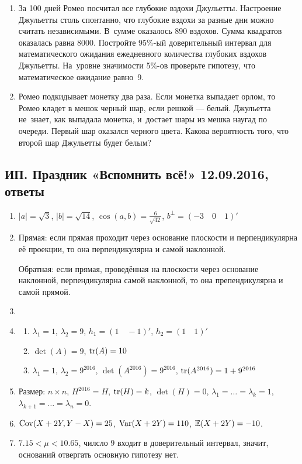 \documentclass[12pt, a4paper]{article}
\begin{document}
\begin{enumerate}
\item За 100 дней Ромео посчитал все глубокие вздохи Джульетты. Настроение Джульетты столь спонтанно, что глубокие вздохи за разные дни можно считать независимыми. В~сумме оказалось 890 вздохов. Сумма квадратов оказалась равна 8000. Постройте 95\%-ый доверительный интервал для математического ожидания ежедневного количества глубоких вздохов Джульетты. На~уровне значимости 5\%-ов проверьте гипотезу, что математическое ожидание равно~9.

\item Ромео подкидывает монетку два раза. Если монетка выпадает орлом, то Ромео кладет в мешок черный шар, если решкой — белый. Джульетта не~знает, как выпадала монетка, и~достает шары из мешка наугад по очереди. Первый шар оказался черного цвета. Какова вероятность того, что второй шар Джульетты будет белым?

\end{enumerate}




\subsection{ИП. Праздник «Вспомнить всё!» 12.09.2016, ответы}

\begin{enumerate}
\item $\lvert a \rvert = \sqrt{3}$, $\lvert b \rvert = \sqrt{14}$, $\cos(a,b) = \frac{6}{\sqrt{42}}$, $b^{\perp} = (-3 \quad 0 \quad 1)'$
\item Прямая: если прямая проходит через основание плоскости и перпендикулярна её проекции, то она перпендикулярна и самой наклонной.

Обратная: если прямая, проведённая на плоскости через основание наклонной, перпендикулярна самой наклонной, то она препендикулярна и самой прямой.
\item
\item
\begin{enumerate}
\item $\lambda_1 = 1$, $\lambda_2 = 9$, $h_1 = (1 \quad -1)'$, $h_2 = (1 \quad 1)'$
\item $\det(A) = 9$, $\operatorname{tr}(A) = 10$
\item $\lambda_1 = 1$, $\lambda_2 = 9^{2016}$, $\det(A^{2016}) = 9^{2016}$, $\operatorname{tr}(A^{2016}) = 1 + 9^{2016}$
\end{enumerate}
\item Размер: $n \times n$, $H^{2016} = H$, $\operatorname{tr}(H) = k$, $\det(H) = 0$, $\lambda_1 = \ldots = \lambda_k = 1$, $\lambda_{k+1} = \ldots = \lambda_{n} = 0$.
\item  $\operatorname{Cov}(X+2Y, Y-X) = 25$, $\operatorname{Var}(X+2Y) = 110$, $\mathbb{E}(X+2Y) = -10$.
\item $7.15 < \mu < 10.65$, чилсло $9$ входит в доверительный интервал, значит, оснований отвергать основную гипотезу нет.
\end{enumerate}
\end{document}
